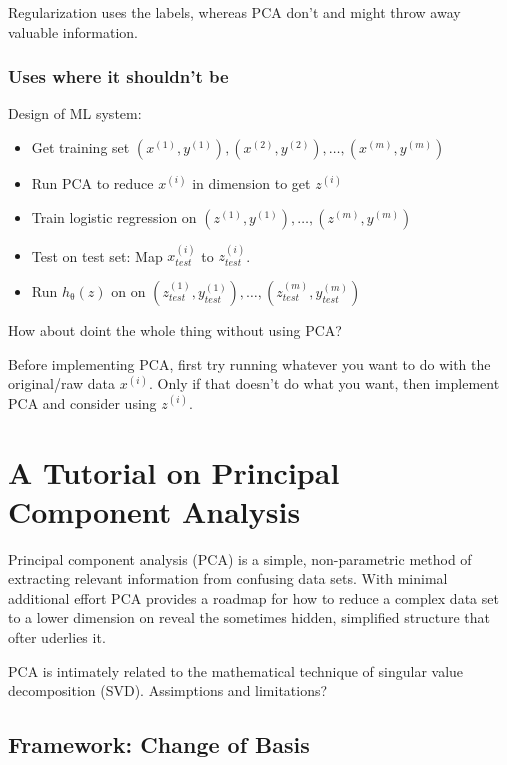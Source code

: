 Regularization uses the labels, whereas PCA don't and might throw away
valuable information.

\hypertarget{uses-where-it-shouldnt-be}{%
\subsubsection{Uses where it shouldn't
be}\label{uses-where-it-shouldnt-be}}

Design of ML system:

\begin{itemize}
\item
  Get training set
  \((x^{(1)},y^{(1)}),(x^{(2)},y^{(2)}),\dots,(x^{(m)},y^{(m)})\)
\item
  Run PCA to reduce \(x^{(i)}\) in dimension to get \(z^{(i)}\)
\item
  Train logistic regression on
  \((z^{(1)},y^{(1)}),\dots,(z^{(m)},y^{(m)})\)
\item
  Test on test set: Map \(x^{(i)}_{test}\) to \(z^{(i)}_{test}\).
\item
  Run \(h_{\uptheta}(z)\) on on
  \((z^{(1)}_{test},y^{(1)}_{test}),\dots,(z^{(m)}_{test},y^{(m)}_{test})\)
\end{itemize}

How about doint the whole thing without using PCA?

Before implementing PCA, first try running whatever you want to do with
the original/raw data \(x^{(i)}\). Only if that doesn't do what you
want, then implement PCA and consider using \(z^{(i)}\).

\hypertarget{a-tutorial-on-principal-component-analysis}{%
\section{A Tutorial on Principal Component
Analysis}\label{a-tutorial-on-principal-component-analysis}}

\cite{shlens2014tutorial}

Principal component analysis (PCA) is a simple, non-parametric method of
extracting relevant information from confusing data sets. With minimal
additional effort PCA provides a roadmap for how to reduce a complex
data set to a lower dimension on reveal the sometimes hidden, simplified
structure that ofter uderlies it.

PCA is intimately related to the mathematical technique of singular
value decomposition (SVD). Assimptions and limitations?

\hypertarget{framework-change-of-basis}{%
\subsection{Framework: Change of
Basis}\label{framework-change-of-basis}}


